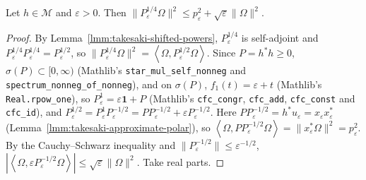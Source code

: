 \begin{lemma}
    \label{lmm:takesaki-shifted-root-bound}
    \leanok
    Let $h \in \mathcal{M}$ and $\varepsilon > 0$. Then $\|P_\varepsilon^{1/4}\Omega\|^2 \le p_\varepsilon^2 + \sqrt{\varepsilon}\|\Omega\|^2$.
\end{lemma}
\begin{proof}
    \leanok
    By Lemma~\ref{lmm:takesaki-shifted-powers}, $P_\varepsilon^{1/4}$ is self-adjoint and $P_\varepsilon^{1/4}P_\varepsilon^{1/4} = P_\varepsilon^{1/2}$, so $\|P_\varepsilon^{1/4}\Omega\|^2 = \left< \Omega, P_\varepsilon^{1/2}\Omega \right>$. Since $P = h^*h \ge 0$, $\sigma(P) \subset [0, \infty)$ (Mathlib's \texttt{star\_mul\_self\_nonneg} and \texttt{spectrum\_nonneg\_of\_nonneg}), and on $\sigma(P)$, $f_1(t) = \varepsilon + t$ (Mathlib's \texttt{Real.rpow\_one}), so $P_\varepsilon^1 = \varepsilon\mathbf{1} + P$ (Mathlib's \texttt{cfc\_congr}, \texttt{cfc\_add}, \texttt{cfc\_const} and \texttt{cfc\_id}), and $P_\varepsilon^{1/2} = P_\varepsilon^1P_\varepsilon^{-1/2} = PP_\varepsilon^{-1/2} + \varepsilon P_\varepsilon^{-1/2}$. Here $PP_\varepsilon^{-1/2} = h^*u_\varepsilon = x_\varepsilon x_\varepsilon^*$ (Lemma~\ref{lmm:takesaki-approximate-polar}), so $\left< \Omega, PP_\varepsilon^{-1/2}\Omega \right> = \|x_\varepsilon^*\Omega\|^2 = p_\varepsilon^2$. By the Cauchy--Schwarz inequality and $\|P_\varepsilon^{-1/2}\| \le \varepsilon^{-1/2}$, $|\left< \Omega, \varepsilon P_\varepsilon^{-1/2}\Omega \right>| \le \sqrt{\varepsilon}\|\Omega\|^2$. Take real parts.
\end{proof}

